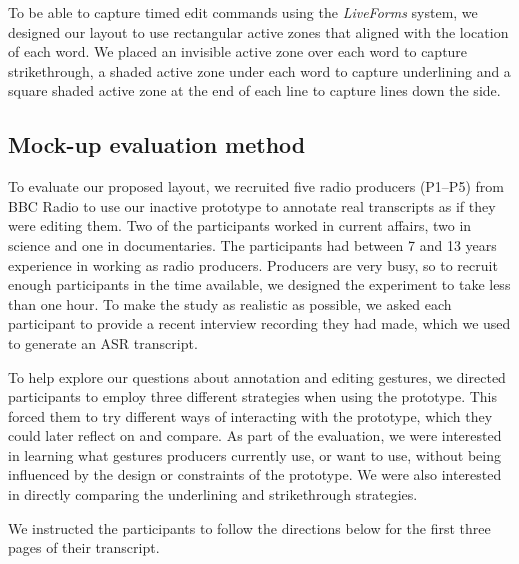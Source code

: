 To be able to capture timed edit commands using the \textit{Live\texttrademark Forms} system, we designed our layout to
use rectangular active zones that aligned with the location of each word.
We placed an invisible active zone over each word to capture strikethrough, a shaded active zone under each word to
capture underlining and a square shaded active zone at the end of each line to capture lines down the side.

\subsection{Mock-up evaluation method}

To evaluate our proposed layout, we recruited five radio producers (P1--P5) from BBC Radio to use our inactive
prototype to annotate real transcripts as if they were editing them.  Two of the participants worked in current
affairs, two in science and one in documentaries.  The participants had between 7 and 13 years experience in working as
radio producers.  Producers are very busy, so to recruit enough participants in the time available, we designed the
experiment to take less than one hour.  To make the study as realistic as possible, we asked each participant to
provide a recent interview recording they had made, which we used to generate an ASR transcript.

To help explore our questions about annotation and editing gestures, we directed participants to employ three different
strategies when using the prototype. This forced them to try different ways of interacting with the prototype, which
they could later reflect on and compare.  As part of the evaluation, we were interested in learning what gestures
producers currently use, or want to use, without being influenced by the design or constraints of the prototype.
We were also interested in directly comparing the underlining and strikethrough strategies.

We instructed the participants to follow the directions below for the first three pages of their transcript.



